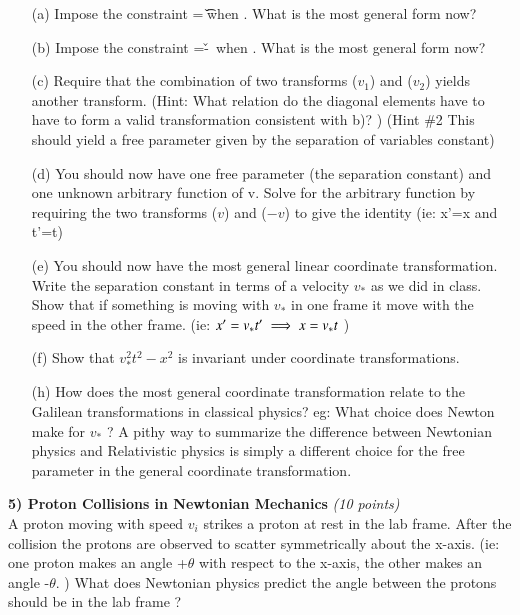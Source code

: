 \begin{itemize}
\item[(a)] Impose the constraint \x=\v\t\ when . What is the most general form now?
\item[(b)] Impose the constraint \xp=-\v\tp\ when . What is the most general form now?
\item[(c)] Require that the combination of two transforms ($v_1$) and ($v_2$) yields another transform. (Hint: What relation do the diagonal elements have to have to form a valid transformation consistent with b)? ) (Hint \#2 This should yield a free parameter given by the separation of variables constant)
\item[(d)] You should now have one free parameter (the separation constant) and one unknown arbitrary function of v. Solve for the arbitrary function by requiring the two transforms ($v$) and ($-v$) to give the identity (ie: x'=x and t'=t)
\item[(e)]You should now have the most general linear coordinate transformation.  Write the separation constant in terms of a velocity $v_*$ as we did in class. Show that if something is moving with $v_*$ in one frame it move with the speed in the other frame. (ie: $x'=v_*t' \implies x=v_*t$ )
\item[(f)]Show that $v_*^2t^2 - x^2$ is invariant under coordinate transformations.
\item[(h)]How does the most general coordinate transformation relate to the Galilean transformations in classical physics? eg: What choice does Newton make for $v_*$ ? A pithy way to summarize the difference between Newtonian physics and Relativistic physics is simply a different choice for the free parameter in the general coordinate transformation. 
\end{itemize}

\vspace*{0.25in}

\textbf{5) Proton Collisions in Newtonian Mechanics  } \hfill \textit{(10 points)}\\

A proton moving with speed $v_i$ strikes a proton at rest in the lab frame.
After the collision the protons are observed to scatter symmetrically about the x-axis.
(ie: one proton makes an angle +$\theta$ with respect to the x-axis, the other makes an angle -$\theta$. )
What does Newtonian physics predict the angle between the protons should be in the lab frame ?

\vspace*{0.25in}

